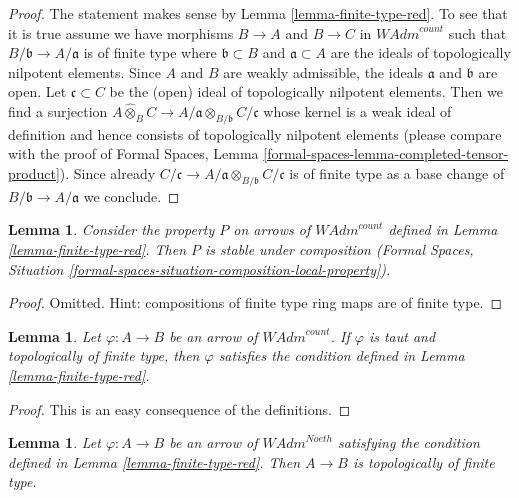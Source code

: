 \documentclass{stacks-project}
\theoremstyle{plain}
\newtheorem{lemma}[subsection]{Lemma}
\theoremstyle{definition}
\theoremstyle{remark}
\numberwithin{equation}{subsection}
\begin{document}
\begin{proof}
The statement makes sense by Lemma \ref{lemma-finite-type-red}.
To see that it is true assume we have morphisms $B \to A$ and $B \to C$
in $\textit{WAdm}^{count}$ such that $B/\mathfrak b \to A/\mathfrak a$
is of finite type where $\mathfrak b \subset B$ and $\mathfrak a \subset A$
are the ideals of topologically nilpotent elements.
Since $A$ and $B$ are weakly admissible, the ideals
$\mathfrak a$ and $\mathfrak b$ are open.
Let $\mathfrak c \subset C$ be the (open) ideal
of topologically nilpotent elements. Then we find a surjection
$A \widehat{\otimes}_B C \to
A/\mathfrak a \otimes_{B/\mathfrak b} C/\mathfrak c$
whose kernel is a weak ideal of definition and hence consists
of topologically nilpotent elements
(please compare with the proof of Formal Spaces,
Lemma \ref{formal-spaces-lemma-completed-tensor-product}). Since already
$C/\mathfrak c \to A/\mathfrak a \otimes_{B/\mathfrak b} C/\mathfrak c$
is of finite type as a base change of $B/\mathfrak b \to A/\mathfrak a$
we conclude.
\end{proof}

\begin{lemma}
\label{lemma-composition-finite-type-red}
Consider the property $P$ on arrows of $\textit{WAdm}^{count}$ defined in
Lemma \ref{lemma-finite-type-red}. Then $P$ is stable under composition
(Formal Spaces, Situation
\ref{formal-spaces-situation-composition-local-property}).
\end{lemma}

\begin{proof}
Omitted. Hint: compositions of finite type ring maps are of finite type.
\end{proof}

\begin{lemma}
\label{lemma-finite-type-finite-type-red}
Let $\varphi : A \to B$ be an arrow of $\textit{WAdm}^{count}$.
If $\varphi$ is taut and topologically of finite type, then $\varphi$
satisfies the condition defined in Lemma \ref{lemma-finite-type-red}.
\end{lemma}

\begin{proof}
This is an easy consequence of the definitions.
\end{proof}

\begin{lemma}
\label{lemma-Noetherian-finite-type-red}
Let $\varphi : A \to B$ be an arrow of $\textit{WAdm}^{Noeth}$
satisfying the condition defined in Lemma \ref{lemma-finite-type-red}.
Then $A \to B$ is topologically of finite type.
\end{lemma}
\end{document}
